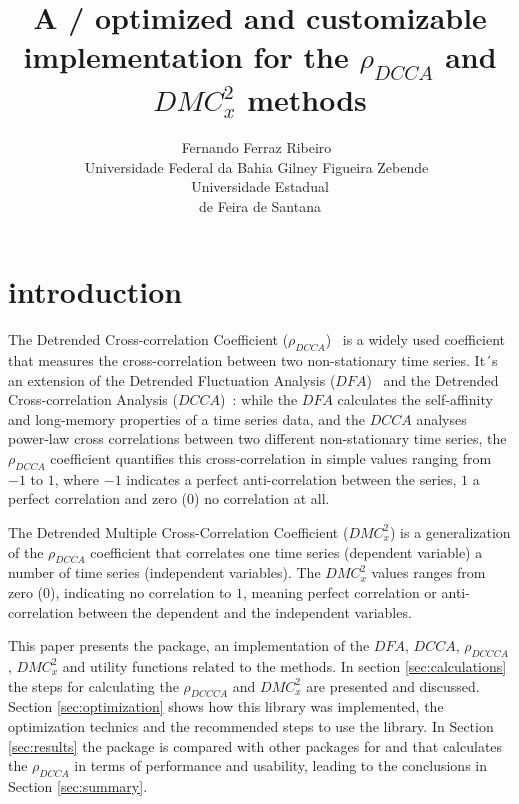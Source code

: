 \documentclass[article]{jss}
\author{Fernando Ferraz Ribeiro~\orcidlink{0000-0002-0685-4774}\\Universidade Federal da Bahia
   \And Gilney Figueira Zebende~\orcidlink{0000-0003-2420-9805}\\Universidade Estadual\\de Feira de Santana}
\title{A \proglang{Python}/\proglang{Zig} optimized and customizable implementation for the $\rho_{DCCA}$ and $DMC_x^2$ methods}
\begin{document}


\section{introduction} \label{sec:intro}

The Detrended Cross-correlation Coefficient ($\rho_{DCCA}$)~\citep{Zebende2011} is a widely used coefficient that measures the cross-correlation between two non-stationary time series. It´s an extension of the Detrended Fluctuation Analysis ($DFA$)~\citep{Peng_1994} and the Detrended Cross-correlation Analysis ($DCCA$)~\citep{Podobnik2008}: while the $DFA$ calculates the self-affinity and long-memory properties of a time series data, and the $DCCA$ analyses power-law cross correlations between two different non-stationary time series, the $\rho_{DCCA}$ coefficient quantifies this cross-correlation in simple values ranging from $-1$ to $1$, where $-1$ indicates a perfect anti-correlation between the series, $1$ a perfect correlation and zero ($0$) no correlation at all.


The Detrended Multiple Cross-Correlation Coefficient \citep{Zebende2018} ($DMC_x^2$) is a generalization of the $\rho_{DCCA}$ coefficient that correlates one time series (dependent variable) a number of time series (independent variables). The $DMC_x^2$ values ranges from zero ($0$), indicating no correlation to $1$, meaning perfect correlation or anti-correlation between the dependent and the independent variables.


This paper presents the   package, an implementation of the $DFA$, $DCCA$, $\rho_{DCCCA}$, $DMC_x^2$ and utility functions related to the methods. In section \ref{sec:calculations} the steps for calculating the $\rho_{DCCCA}$ and $DMC_x^2$ are presented and discussed. Section \ref{sec:optimization} shows how this library was implemented, the optimization technics and the recommended steps to use the library. In Section \ref{sec:results} the  package is compared with other packages for  and  that calculates the $\rho_{DCCA}$ in terms of performance and usability, leading to the conclusions in Section \ref{sec:summary}.
\end{document}
